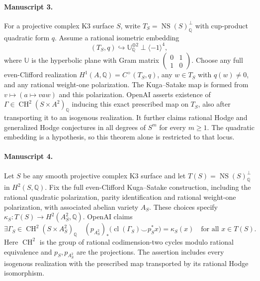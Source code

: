 \documentclass[11pt]{article}
\begin{document}
\paragraph{Manuscript 3.}
For a projective complex K3 surface $S$, write $T_S=\operatorname{NS}(S)_{\mathbb Q}^{\perp}$ with cup-product quadratic form $q$. Assume a rational isometric embedding
\[
(T_S,q)\hookrightarrow\mathbb U_{\mathbb Q}^{\oplus2}\perp\langle-1\rangle^4,
\]
where $\mathbb U$ is the hyperbolic plane with Gram matrix $\left(\begin{smallmatrix}0&1\\1&0\end{smallmatrix}\right)$. Choose any full even-Clifford realization $H^1(A,\mathbb Q)=C^+(T_S,q)$, any $w\in T_S$ with $q(w)\ne0$, and any rational weight-one polarization. The Kuga--Satake map is formed from $v\mapsto(a\mapsto vaw)$ and this polarization. OpenAI asserts existence of $\Gamma\in\operatorname{CH}^2(S\times A^2)_{\mathbb Q}$ inducing this exact prescribed map on $T_S$, also after transporting it to an isogenous realization. It further claims rational Hodge and generalized Hodge conjectures in all degrees of $S^m$ for every $m\ge1$. The quadratic embedding is a hypothesis, so this theorem alone is restricted to that locus.

\paragraph{Manuscript 4.}
Let $S$ be any smooth projective complex K3 surface and let $T(S)=\operatorname{NS}(S)_{\mathbb Q}^{\perp}$ in $H^2(S,\mathbb Q)$. Fix the full even-Clifford Kuga--Satake construction, including the rational quadratic polarization, parity identification and rational weight-one polarization, with associated abelian variety $A_S$. These choices specify $\kappa_S:T(S)\to H^2(A_S^2,\mathbb Q)$. OpenAI claims
\[
\exists\Gamma_S\in\operatorname{CH}^2(S\times A_S^2)_{\mathbb Q}\quad
(p_{A_S^2})_*\bigl(\operatorname{cl}(\Gamma_S)\smile p_S^*x\bigr)=\kappa_S(x)
\quad\text{for all }x\in T(S).
\]
Here $\operatorname{CH}^2$ is the group of rational codimension-two cycles modulo rational equivalence and $p_S,p_{A_S^2}$ are the projections. The assertion includes every isogenous realization with the prescribed map transported by its rational Hodge isomorphism.
\end{document}
